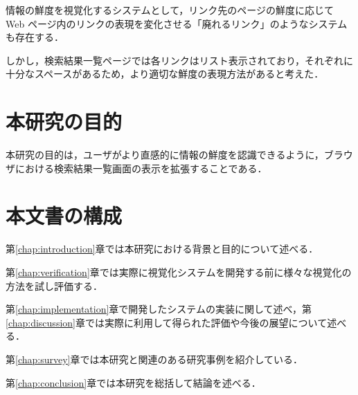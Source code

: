 
情報の鮮度を視覚化するシステムとして，リンク先のページの鮮度に応じて Web ページ内のリンクの表現を変化させる「廃れるリンク」\cite{dyinglink}のようなシステムも存在する．

しかし，検索結果一覧ページでは各リンクはリスト表示されており，それぞれに十分なスペースがあるため，より適切な鮮度の表現方法があると考えた．

\section{本研究の目的}

本研究の目的は，ユーザがより直感的に情報の鮮度を認識できるように，ブラウザにおける検索結果一覧画面の表示を拡張することである．

\section{本文書の構成}

第\ref{chap:introduction}章では本研究における背景と目的について述べる．

第\ref{chap:verification}章では実際に視覚化システムを開発する前に様々な視覚化の方法を試し評価する．

第\ref{chap:implementation}章で開発したシステムの実装に関して述べ，第\ref{chap:discussion}章では実際に利用して得られた評価や今後の展望について述べる．

第\ref{chap:survey}章では本研究と関連のある研究事例を紹介している．

第\ref{chap:conclusion}章では本研究を総括して結論を述べる．
